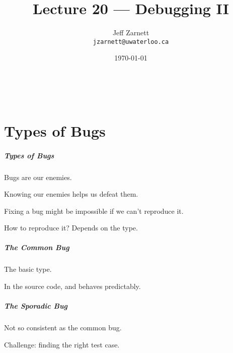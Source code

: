 
\usepackage{alltt}

\title{Lecture 20 --- Debugging II }

\author{Jeff Zarnett \\ \small \texttt{jzarnett@uwaterloo.ca}}
\date{\today}



\begin{frame}
  \titlepage

  \vfill
  \begin{center}
    \\
                  {\tiny\CcNote{\CcLongnameByNcSa}}
                  \vspace*{-2.5ex}
  \end{center}

\end{frame}


\part{Types of Bugs}
\frame{\partpage}


\begin{frame}
\frametitle{Types of Bugs}
\begin{changemargin}{1cm}
Bugs are our enemies.

Knowing our enemies helps us defeat them.

Fixing a bug might be impossible if we can't \alert{reproduce} it.

How to reproduce it? Depends on the type.
\end{changemargin}
\end{frame}

\begin{frame}
\frametitle{The Common Bug}
\begin{changemargin}{1cm}
The basic type.

In the source code, and behaves predictably.

\end{changemargin}
\end{frame}

\begin{frame}
\frametitle{The Sporadic Bug}
\begin{changemargin}{1cm}
Not so consistent as the common bug. 

Challenge: finding the right test case.


\end{changemargin}
\end{frame}

